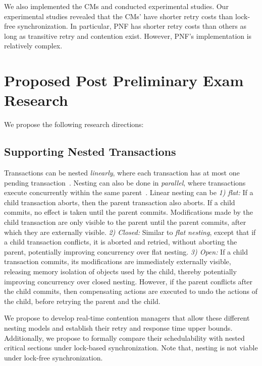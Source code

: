 \documentclass[12pt,english]{report}
\begin{document}
We also implemented the CMs and conducted experimental studies. Our experimental studies revealed that the CMs' have shorter retry costs than lock-free synchronization. In particular, PNF has shorter retry costs than others as long as transitive retry and contention exist. However, PNF's implementation is relatively complex. 



\section{Proposed Post Preliminary Exam Research}

We propose the following research directions:

\subsection{Supporting Nested Transactions} 

Transactions can be nested \textit{linearly}, where each transaction has at most one pending transaction~\cite{Moss2006186}. Nesting can also be done in \textit{parallel}, where transactions execute concurrently within the same parent~\cite{volos2009nepaltm}. Linear nesting can be \textit{1) flat:} If a child transaction aborts, then the parent transaction also aborts. If a child commits, no effect is taken until the parent commits. Modifications made by the child transaction are only visible to the parent until the parent commits, after which they are externally visible. 
%
\textit{2) Closed:} Similar to \textit{flat nesting}, except that if a child transaction conflicts, it is aborted and retried, without aborting the parent, potentially improving concurrency over flat nesting. 
%
\textit{3) Open:} If a child transaction commits, its modifications are immediately externally visible, releasing memory isolation  of objects used by the child, thereby potentially improving concurrency over closed nesting. However, if the parent conflicts after the child commits, then compensating actions are executed to undo the actions of the child, before retrying the parent and the child. 


We propose to develop real-time contention managers that allow these different nesting models and establish their retry and response time upper bounds. Additionally, we propose to formally compare their schedulability with nested critical sections under lock-based synchronization. Note that, nesting is not viable under lock-free synchronization.
\end{document}
